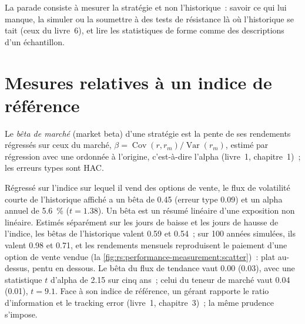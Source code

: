 La parade consiste à mesurer la stratégie et non l'historique~: savoir ce qui lui manque, la simuler ou la soumettre à des tests de résistance là où l'historique se tait (ceux du
livre~6), et lire les statistiques de forme comme des descriptions d'un échantillon.

\section{Mesures relatives à un indice de référence}

\begin{definition}\label{def:rs:performance-measurement:beta}
Le \emph{bêta de marché} (market beta) d'une stratégie est la pente de ses rendements régressés sur ceux du marché, $\beta = \operatorname{Cov}(r, r_m)/\operatorname{Var}(r_m)$,
estimé par régression avec une ordonnée à l'origine, c'est-à-dire l'alpha (livre~1, chapitre~1)~; les erreurs types sont HAC.
\end{definition}

Régressé sur l'indice sur lequel il vend des options de vente, le flux de volatilité courte de l'historique affiché a un bêta de 0.45 (erreur type 0.09) et un alpha annuel de 5.6~\%
($t = 1.38$). Un bêta est un résumé linéaire d'une exposition non linéaire. Estimés séparément sur les jours de baisse et les jours de hausse de l'indice, les bêtas de l'historique valent 0.59 et
0.54~; sur 100 années simulées, ils valent 0.98 et 0.71, et les rendements mensuels reproduisent le paiement d'une option de vente vendue (la \cref{fig:rs:performance-measurement:scatter})~:
plat au-dessus, pentu en dessous. Le bêta du flux de tendance vaut 0.00 (0.03), avec une statistique $t$ d'alpha de 2.15 sur cinq ans~; celui du teneur de marché vaut 0.04 (0.01), $t =
9.1$. Face à son indice de référence, un gérant rapporte le ratio d'information et le tracking error (livre~1, chapitre~3)~; la même prudence s'impose.

\begin{omfigure}

\label{fig:rs:performance-measurement:scatter}
\end{omfigure}

